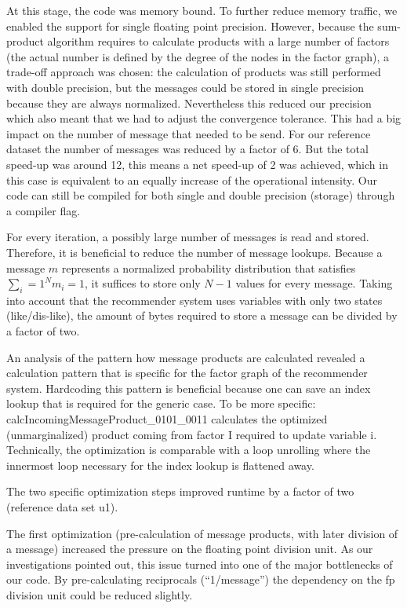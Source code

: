 At this stage, the code was memory bound. To further reduce memory traffic, we enabled the support for single floating point precision. However, because the sum-product algorithm requires to calculate products with a large number of factors (the actual number is defined by the degree of the nodes in the factor graph), a trade-off approach was chosen: the calculation of products was still performed with double precision, but the messages could be stored in single precision because they are always normalized. Nevertheless this reduced our precision which also meant that we had to adjust the convergence tolerance. This had a big impact on the number of message that needed to be send. For our reference dataset the number of messages was reduced by a factor of 6. But the total speed-up was around 12, this means a net speed-up of 2 was achieved, which in this case is equivalent to an equally increase of the operational intensity. Our code can still be compiled for both single and double precision (storage) through a compiler flag.

For every iteration, a possibly large number of messages is read and stored. Therefore, it is beneficial to reduce the number of message lookups. Because a message $m$ represents a normalized probability distribution that satisfies $\sum_i=1^N m_i = 1$, it suffices to store only $N-1$ values for every message. Taking into account that the recommender system uses variables with only two states (like/dis-like), the amount of bytes required to store a message can be divided by a factor of two. 

An analysis of the pattern how message products are calculated revealed a calculation pattern that is specific for the factor graph of the recommender system. Hardcoding this pattern is beneficial because one can save an index lookup that is required for the generic case. To be more specific: calcIncomingMessageProduct\_0101\_0011 calculates the optimized (unmarginalized) product coming from factor I required to update variable i. 
Technically, the optimization is comparable with a loop unrolling where the innermost loop necessary for the index lookup is flattened away.

The two specific optimization steps improved runtime by a factor of two (reference data set u1).

The first optimization (pre-calculation of message products, with later division of a message) increased the pressure on the floating point division unit. As our investigations pointed out, this issue turned into one of the major bottlenecks of our code. By pre-calculating reciprocals (“1/message”) the dependency on the fp division unit could be reduced slightly.  

